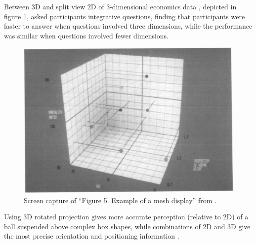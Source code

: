 \documentclass{monashthesis}
\begin{document}
Between 3D and split view 2D of 3-dimensional economics data
\textcite{wickens_implications_1994}, depicted in figure
\ref{fig:wickens94fig}, asked participants integrative questions,
finding that participants were faster to answer when questions involved
three dimensions, while the performance was similar when questions
involved fewer dimensions.




\begin{figure}

{\centering \includegraphics[width=0.7\linewidth]{./figures/wickens94fig} 

}

\caption{Screen capture of ``Figure 5. Example of a mesh
display'' from \textcite{wickens_implications_1994}.}\label{fig:wickens94fig}
\end{figure}

Using 3D rotated projection gives more accurate perception (relative to
2D) of a ball suspended above complex box shapes, while combinations of
2D and 3D give the most precise orientation and positioning information
\autocite[depicted in figure
\ref{fig:tory06fig}]{tory_visualization_2006}.
\end{document}
